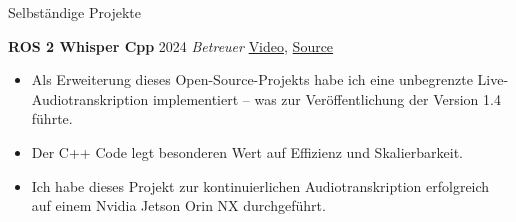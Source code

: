 \begin{rubric}{Selbständige Projekte}

\entry*[] \textbf{ROS 2 Whisper Cpp} \hfill 2024 \newline 
\emph{Betreuer} \hfill \href{https://github.com/ros-ai/ros2_whisper/blob/main/doc/harry_potter_sample.gif}{Video}, \href{https://github.com/ros-ai/ros2_whisper}{\faGithub Source} \newline  
\vspace{\CVItemizeHeaderSpacing} \begin{itemize}[leftmargin=*, rightmargin=1cm]
	\setlength{\itemsep}{\CVItemizeSpacing}
	\item Als Erweiterung dieses Open-Source-Projekts habe ich eine unbegrenzte Live-Audiotranskription implementiert -- was zur Veröffentlichung der Version 1.4 führte. 
	\item Der C++ Code legt besonderen Wert auf Effizienz und Skalierbarkeit.
	\item Ich habe dieses Projekt zur kontinuierlichen Audiotranskription erfolgreich auf einem Nvidia Jetson Orin NX durchgeführt.
\end{itemize}  

\begin{comment}
	
\entry*[] \textbf{ROS 2 Computer Vision} \hfill 2024 \newline \emph{Autor} \hfill \href{https://github.com/NathanCorral/ROS-HF-Vision/blob/main/doc/gifs/ex_german_roads.gif}{Video}, \href{https://github.com/NathanCorral/ROS-HF-Vision/tree/main}{\faGithub Source} \newline  
\vspace{\CVItemizeHeaderSpacing} \begin{itemize}[leftmargin=*, rightmargin=1cm] 
	\setlength{\itemsep}{\CVItemizeSpacing}  
	\item Dieses Projekt implementiert Computer-Vision (CV) Aufgaben (Objekterkennung, Maskenbeschriftung pro Pixel) als parallele ROS 2-Knoten.
	\item Modernste CV Modellen (wie DETR und Maskformer) sind von Hugging Face ~~~~~~~~~~~~ automatisch heruntergeladen.
	\item Die Ergebnisse der CV Modellen, die auf verschiedenen Datensätzen trainiert  ~~~~~~~~~~~~~~ worden sein können, werden von einem globalen Server in einen universellen ~~~~~~~~~~~~~~ Index umgewandelt.  
	\item Diese Pipeline wird entweder auf eine Live-Kameraübertragung oder auf Bilder aus einem vorab trainierten Datensatz angewandt, wobei die Ergebnisse in Echtzeit angezeigt werden, um die durch die Modellwahl verursachte unterschiedliche Verzögerung zu verdeutlichen.
\end{itemize}  


\end{comment}
\end{rubric}
